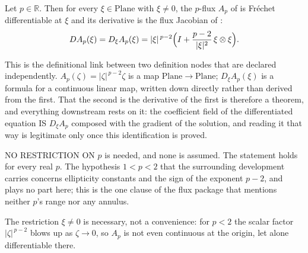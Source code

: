 \begin{lemma}
Let $p\in\mathbb{R}$.  Then for every $\xi\in\mathrm{Plane}$ with $\xi\ne0$, the $p$-flux $A_p$ of
 is Fr\'echet differentiable at $\xi$ and its derivative is the flux Jacobian of
:
\[
  DA_p(\xi)=D_\xi A_p(\xi)
  =\lvert\xi\rvert^{\,p-2}\Bigl(I+\frac{p-2}{\lvert\xi\rvert^{2}}\,\xi\otimes\xi\Bigr).
\]

This is the definitional link between two definition nodes that are declared independently.
$A_p(\zeta)=\lvert\zeta\rvert^{\,p-2}\zeta$ is a map $\mathrm{Plane}\to\mathrm{Plane}$;
$D_\xi A_p(\xi)$ is a formula for a continuous linear map, written down directly rather than
derived from the first.  That the second is the derivative of the first is therefore a theorem,
and everything downstream rests on it: the coefficient field of the differentiated equation IS
$D_\xi A_p$ composed with the gradient of the solution, and reading it that way is legitimate
only once this identification is proved.

NO RESTRICTION ON $p$ is needed, and none is assumed.  The statement holds for every real $p$.
The hypothesis $1<p<2$ that the surrounding development carries concerns ellipticity constants
and the sign of the exponent $p-2$, and plays no part here; this is the one clause of the flux
package that mentions neither $p$'s range nor any annulus.

The restriction $\xi\ne0$ is necessary, not a convenience: for $p<2$ the scalar factor
$\lvert\zeta\rvert^{\,p-2}$ blows up as $\zeta\to0$, so $A_p$ is not even continuous at the
origin, let alone differentiable there.
\end{lemma}
